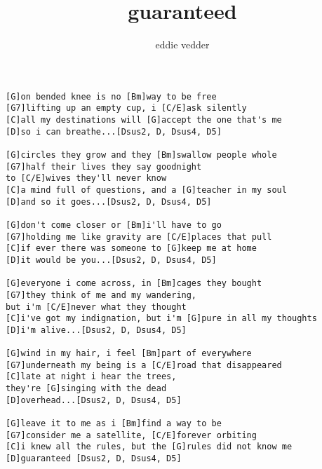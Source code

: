 \author{eddie vedder}
\title{guaranteed}
\maketitle
\begin{verbatim}
[G]on bended knee is no [Bm]way to be free
[G7]lifting up an empty cup, i [C/E]ask silently
[C]all my destinations will [G]accept the one that's me
[D]so i can breathe...[Dsus2, D, Dsus4, D5]

[G]circles they grow and they [Bm]swallow people whole
[G7]half their lives they say goodnight
to [C/E]wives they'll never know
[C]a mind full of questions, and a [G]teacher in my soul
[D]and so it goes...[Dsus2, D, Dsus4, D5]

[G]don't come closer or [Bm]i'll have to go
[G7]holding me like gravity are [C/E]places that pull
[C]if ever there was someone to [G]keep me at home
[D]it would be you...[Dsus2, D, Dsus4, D5]

[G]everyone i come across, in [Bm]cages they bought
[G7]they think of me and my wandering,
but i'm [C/E]never what they thought
[C]i've got my indignation, but i'm [G]pure in all my thoughts
[D]i'm alive...[Dsus2, D, Dsus4, D5]

[G]wind in my hair, i feel [Bm]part of everywhere
[G7]underneath my being is a [C/E]road that disappeared
[C]late at night i hear the trees,
they're [G]singing with the dead
[D]overhead...[Dsus2, D, Dsus4, D5]

[G]leave it to me as i [Bm]find a way to be
[G7]consider me a satellite, [C/E]forever orbiting
[C]i knew all the rules, but the [G]rules did not know me
[D]guaranteed [Dsus2, D, Dsus4, D5]
\end{verbatim}